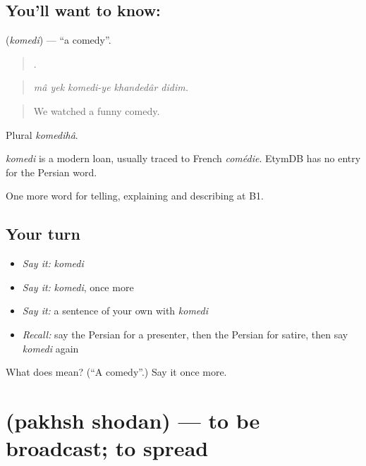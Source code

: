 \subsection*{You'll want to know: }
\textbf{} (\emph{komedi}) — \textquotedblleft{}a comedy\textquotedblright{}.

\begin{quote}
     .
\end{quote}

\begin{quote}
\emph{mâ yek komedi-ye khandedâr didim.}
\end{quote}

\begin{quote}
We watched a funny comedy.
\end{quote}

Plural \emph{komedihâ}.

\begin{cousinweb}
\emph{komedi} is a modern loan, usually traced to French \emph{comédie}. EtymDB has no entry for the Persian word.
\end{cousinweb}

\begin{grammarlens}[title={What you've built}]
One more word for telling, explaining and describing at B1.
\end{grammarlens}

\subsection*{Your turn}
\begin{itemize}
\raggedright
  \item \emph{Say it:} \emph{komedi}
  \item \emph{Say it:} \emph{komedi}, once more
  \item \emph{Say it:} a sentence of your own with \emph{komedi}
  \item \emph{Recall:} say the Persian for a presenter, then the Persian for satire, then say \emph{komedi} again
\end{itemize}

\begin{tcolorbox}[breakable,colback=teal!4,colframe=teal!35!black,title={Before you move on}]
What does  mean? (\textquotedblleft{}A comedy\textquotedblright{}.) Say it once more.
\end{tcolorbox}
\section[\texorpdfstring{\fa{پخش} \fa{شدن} (pakhsh shodan)}{پخش شدن (pakhsh shodan)}]{  (pakhsh shodan) — to be broadcast; to spread}

